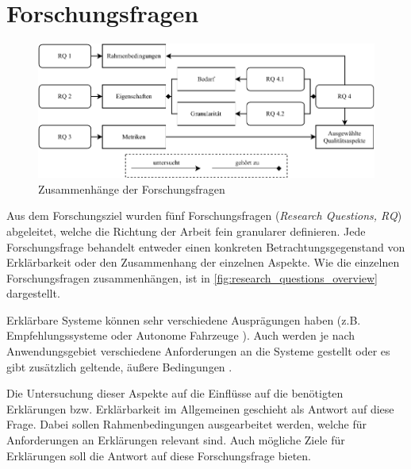 \section{Forschungsfragen}

\begin{figure}[htb!]
    \includegraphics[width=\textwidth]{contents/03_research_design/res/research_questions_overview.pdf}
    \caption{Zusammenhänge der Forschungsfragen}
    \label{fig:research_questions_overview}
\end{figure}

Aus dem Forschungsziel wurden fünf Forschungsfragen (\textit{Research Questions, RQ}) abgeleitet, welche die Richtung der Arbeit fein granularer definieren. Jede Forschungsfrage behandelt entweder einen konkreten Betrachtungsgegenstand von Erklärbarkeit oder den Zusammenhang der einzelnen Aspekte. Wie die einzelnen Forschungsfragen zusammenhängen, ist in \autoref{fig:research_questions_overview} dargestellt.

\smallskip

\noindent{}

\smallskip

Erklärbare Systeme können sehr verschiedene Ausprägungen haben (z.B. Empfehlungssysteme \cite{kunkel_let_2019} oder Autonome Fahrzeuge \cite{wiegand2019drive}). Auch werden je nach Anwendungsgebiet verschiedene Anforderungen an die Systeme gestellt oder es gibt zusätzlich geltende, äußere Bedingungen \cite{chazette_knowledge_nodate}.

Die Untersuchung dieser Aspekte auf die Einflüsse auf die benötigten Erklärungen bzw. Erklärbarkeit im Allgemeinen geschieht als Antwort auf diese Frage. Dabei sollen Rahmenbedingungen ausgearbeitet werden, welche für Anforderungen an Erklärungen relevant sind. Auch mögliche Ziele für Erklärungen soll die Antwort auf diese Forschungsfrage bieten. 

